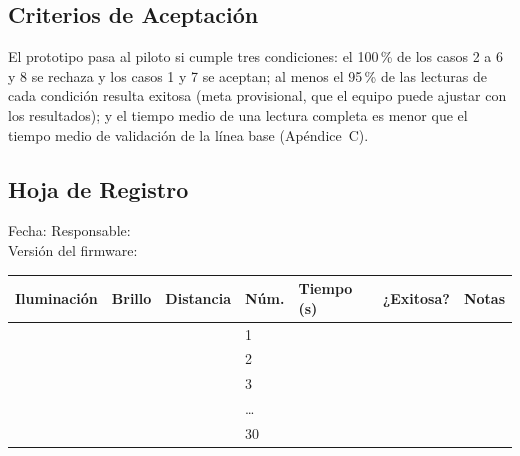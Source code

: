 \subsection{Criterios de Aceptación}
El prototipo pasa al piloto si cumple tres condiciones: el 100\,\% de los
casos 2 a 6 y 8 se rechaza y los casos 1 y 7 se aceptan; al menos el
95\,\% de las lecturas de cada condición resulta exitosa (meta provisional,
que el equipo puede ajustar con los resultados); y el tiempo medio de una
lectura completa es menor que el tiempo medio de validación de la línea base
(Apéndice~C).

\subsection{Hoja de Registro}
\noindent Fecha: \linea[3cm] \quad Responsable: \linea[5cm]\\[0.5em]
Versión del firmware: \linea[3cm]

\medskip
\noindent
{\small
	\begin{tabular}{|p{2.4cm}|p{1.4cm}|p{1.6cm}|p{1.1cm}|p{2.2cm}|p{1.8cm}|p{2.1cm}|}
		\hline
		\textbf{Iluminación} & \textbf{Brillo} & \textbf{Distancia} & \textbf{Núm.} & \textbf{Tiempo (s)} & \textbf{¿Exitosa?} & \textbf{Notas} \\
		\hline
		                     &                 &                    & 1             &                     &                    &                        \\[0.6em] \hline
		                     &                 &                    & 2             &                     &                    &                        \\[0.6em] \hline
		                     &                 &                    & 3             &                     &                    &                        \\[0.6em] \hline
		                     &                 &                    & \dots         &                     &                    &                        \\[0.6em] \hline
		                     &                 &                    & 30            &                     &                    &                        \\[0.6em] \hline
	\end{tabular}}

